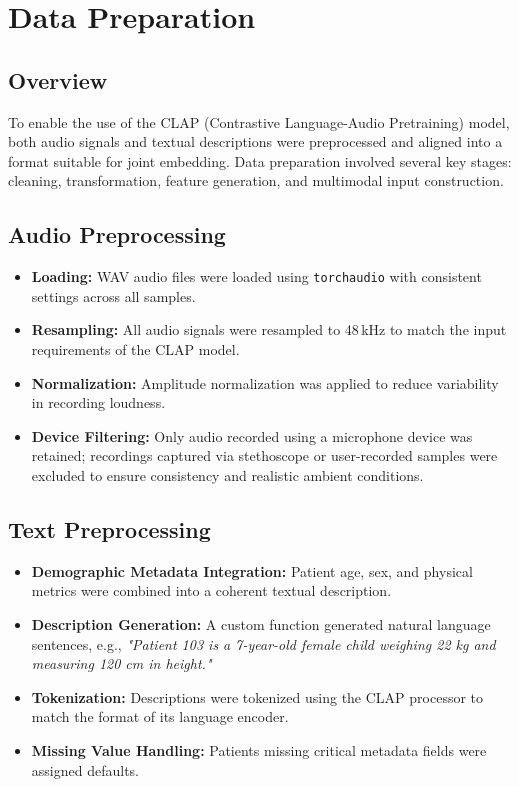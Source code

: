 \section{Data Preparation}

\subsection*{Overview}
To enable the use of the CLAP (Contrastive Language-Audio Pretraining) model, both audio signals and textual descriptions were preprocessed and aligned into a format suitable for joint embedding. Data preparation involved several key stages: cleaning, transformation, feature generation, and multimodal input construction.

\subsection{Audio Preprocessing}
\begin{itemize}
    \item \textbf{Loading:} WAV audio files were loaded using \texttt{torchaudio} with consistent settings across all samples.
    \item \textbf{Resampling:} All audio signals were resampled to 48\,kHz to match the input requirements of the CLAP model.
    \item \textbf{Normalization:} Amplitude normalization was applied to reduce variability in recording loudness.
    \item \textbf{Device Filtering:} Only audio recorded using a microphone device was retained; recordings captured via stethoscope or user-recorded samples were excluded to ensure consistency and realistic ambient conditions.
\end{itemize}

\subsection{Text Preprocessing}
\begin{itemize}
    \item \textbf{Demographic Metadata Integration:} Patient age, sex, and physical metrics were combined into a coherent textual description.
    \item \textbf{Description Generation:} A custom function generated natural language sentences, e.g., \textit{"Patient 103 is a 7-year-old female child weighing 22 kg and measuring 120 cm in height."}
    \item \textbf{Tokenization:} Descriptions were tokenized using the CLAP processor to match the format of its language encoder.
    \item \textbf{Missing Value Handling:} Patients missing critical metadata fields were assigned defaults.
\end{itemize}

